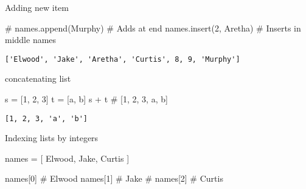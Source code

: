 \documentclass[
  letterpaper,
  DIV=11,
  numbers=noendperiod]{scrreprt}
\newenvironment{Shaded}{\begin{snugshade}}{\end{snugshade}}
\newcommand{\CommentTok}[1]{\textcolor[rgb]{0.37,0.37,0.37}{#1}}
\newcommand{\DecValTok}[1]{\textcolor[rgb]{0.68,0.00,0.00}{#1}}
\newcommand{\NormalTok}[1]{\textcolor[rgb]{0.00,0.46,0.62}{#1}}
\newcommand{\OperatorTok}[1]{\textcolor[rgb]{0.37,0.37,0.37}{#1}}
\newcommand{\StringTok}[1]{\textcolor[rgb]{0.13,0.47,0.30}{#1}}
\begin{document}
Adding new item

\begin{Shaded}
\begin{Highlighting}[]
\CommentTok{\# names.append(\textquotesingle{}Murphy\textquotesingle{})    \# Adds at end}
\NormalTok{names.insert(}\DecValTok{2}\NormalTok{, }\StringTok{\textquotesingle{}Aretha\textquotesingle{}}\NormalTok{) }\CommentTok{\# Inserts in middle}
\NormalTok{names}
\end{Highlighting}
\end{Shaded}

\begin{verbatim}
['Elwood', 'Jake', 'Aretha', 'Curtis', 8, 9, 'Murphy']
\end{verbatim}

concatenating list

\begin{Shaded}
\begin{Highlighting}[]
\NormalTok{s }\OperatorTok{=}\NormalTok{ [}\DecValTok{1}\NormalTok{, }\DecValTok{2}\NormalTok{, }\DecValTok{3}\NormalTok{]}
\NormalTok{t }\OperatorTok{=}\NormalTok{ [}\StringTok{\textquotesingle{}a\textquotesingle{}}\NormalTok{, }\StringTok{\textquotesingle{}b\textquotesingle{}}\NormalTok{]}
\NormalTok{s }\OperatorTok{+}\NormalTok{ t           }\CommentTok{\# [1, 2, 3, \textquotesingle{}a\textquotesingle{}, \textquotesingle{}b\textquotesingle{}]}
\end{Highlighting}
\end{Shaded}

\begin{verbatim}
[1, 2, 3, 'a', 'b']
\end{verbatim}

Indexing lists by integers

\begin{Shaded}
\begin{Highlighting}[]
\NormalTok{names }\OperatorTok{=}\NormalTok{ [ }\StringTok{\textquotesingle{}Elwood\textquotesingle{}}\NormalTok{, }\StringTok{\textquotesingle{}Jake\textquotesingle{}}\NormalTok{, }\StringTok{\textquotesingle{}Curtis\textquotesingle{}}\NormalTok{ ]}

\NormalTok{names[}\DecValTok{0}\NormalTok{]  }\CommentTok{\# \textquotesingle{}Elwood\textquotesingle{}}
\NormalTok{names[}\DecValTok{1}\NormalTok{]  }\CommentTok{\# \textquotesingle{}Jake\textquotesingle{}}
\CommentTok{\# names[2]  \# \textquotesingle{}Curtis\textquotesingle{}}
\end{Highlighting}
\end{Shaded}
\end{document}
